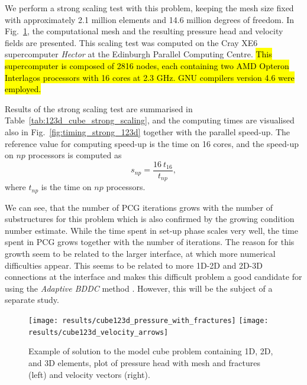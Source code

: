 We perform a strong scaling test with this problem, keeping the mesh size
fixed with approximately 2.1 million elements and 14.6 million degrees of
freedom. In Fig.~\ref{fig:cube123d_problem}, the computational mesh and the
resulting pressure head and velocity fields are presented. This scaling test
was computed on the Cray XE6 supercomputer \emph{Hector} at the Edinburgh
Parallel Computing Centre.
\hl{This supercomputer is composed of 2816 nodes, 
each containing two AMD Opteron Interlagos processors with 16 cores at 2.3 GHz.
GNU compilers version 4.6 were employed.}

Results of the strong scaling test are summarised in
Table~\ref{tab:123d_cube_strong_scaling}, and the computing times are
visualised also in Fig.~\ref{fig:timing_strong_123d} together with the
parallel speed-up. The reference value for computing speed-up is the time on
16 cores, and the speed-up on $np$ processors is computed as
\begin{equation}
s_{np} = \frac{16 \ t_{16}}{t_{np}},
\end{equation}
where $t_{np}$ is the time on $np$ processors.

We can see, that the number of PCG iterations grows with the number of
substructures for this problem which is also confirmed by the growing
condition number estimate. While the time spent in set-up phase scales very
well, the time spent in PCG grows together with the number of iterations. The
reason for this growth seem to be related to the larger interface, at which
more numerical difficulties appear. This seems to be related to more 1D-2D and
2D-3D connections at the interface and makes this difficult problem a good candidate for
using the \emph{Adaptive BDDC} method \cite{Sousedik-2013-AMB,Mandel-2012-ABT}. 
However, this will be the subject of a separate study.

\begin{figure}[ptbh]
\begin{center}
\texttt{[image: results/cube123d\_pressure\_with\_fractures]}
\texttt{[image: results/cube123d\_velocity\_arrows]}
\end{center}
\caption{\label{fig:cube123d_problem}
Example of solution to the model cube problem containing 1D, 2D, and
3D elements, plot of pressure head with mesh and fractures (left) and velocity
vectors (right).}
\end{figure}

